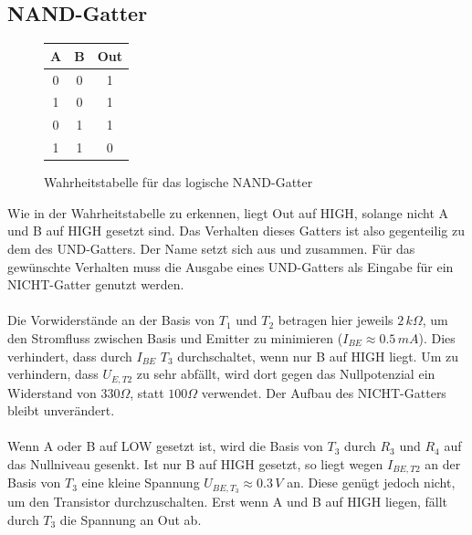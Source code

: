\subsection{NAND-Gatter}
\begin{figure}[h]
	\centering
	\hspace{1cm}
	\begin{tabular}{|c|c|c|}
		\hline
		\textbf{A} & \textbf{B} & \textbf{Out} \\
		\hline
		0 & 0 & 1 \\
		1 & 0 & 1 \\
		0 & 1 & 1 \\
		1 & 1 & 0 \\
		\hline
	\end{tabular}
	\caption{Wahrheitstabelle für das logische NAND-Gatter}
\end{figure}
Wie in der Wahrheitstabelle zu erkennen, liegt Out auf HIGH, solange nicht A und B auf HIGH gesetzt sind. Das Verhalten dieses Gatters ist also gegenteilig zu dem des UND-Gatters. Der Name  setzt sich aus  und  zusammen. Für das gewünschte Verhalten muss die Ausgabe eines UND-Gatters als Eingabe für ein NICHT-Gatter genutzt werden.\\\\
Die Vorwiderstände an der Basis von $T_1$ und $T_2$ betragen hier jeweils $2\,k\Omega$, um den Stromfluss zwischen Basis und Emitter zu minimieren ($I_{BE} \approx 0.5\,mA$). Dies verhindert, dass durch $I_{BE}$ $T_3$ durchschaltet, wenn nur B auf HIGH liegt. Um zu verhindern, dass $U_{E,T2}$ zu sehr abfällt, wird dort gegen das Nullpotenzial ein Widerstand von $330\Omega$, statt $100\Omega$ verwendet. Der Aufbau des NICHT-Gatters bleibt unverändert.\\\\
Wenn A oder B auf LOW gesetzt ist, wird die Basis von $T_3$ durch $R_3$ und $R_4$ auf das Nullniveau gesenkt. Ist nur B auf HIGH gesetzt, so liegt wegen $I_{BE,T2}$ an der Basis von $T_3$ eine kleine Spannung $U_{BE,T_3} \approx 0.3\,V$ an. Diese genügt jedoch nicht, um den Transistor durchzuschalten. Erst wenn A und B auf HIGH liegen, fällt durch $T_3$ die Spannung an Out ab.\\
